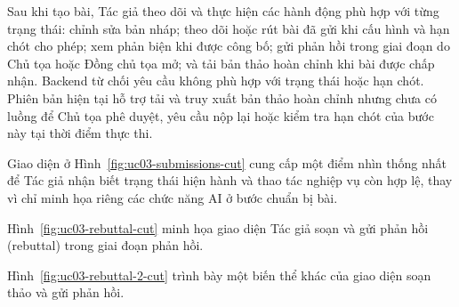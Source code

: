 Sau khi tạo bài, Tác giả theo dõi và thực hiện các hành động phù hợp với từng trạng thái: chỉnh sửa bản nháp; theo dõi hoặc rút bài đã gửi khi cấu hình và hạn chót cho phép; xem phản biện khi được công bố; gửi phản hồi trong giai đoạn do Chủ tọa hoặc Đồng chủ tọa mở; và tải bản thảo hoàn chỉnh khi bài được chấp nhận. Backend từ chối yêu cầu không phù hợp với trạng thái hoặc hạn chót. Phiên bản hiện tại hỗ trợ tải và truy xuất bản thảo hoàn chỉnh nhưng chưa có luồng để Chủ tọa phê duyệt, yêu cầu nộp lại hoặc kiểm tra hạn chót của bước này tại thời điểm thực thi.


Giao diện ở Hình~\ref{fig:uc03-submissions-cut} cung cấp một điểm nhìn thống nhất để Tác giả nhận biết trạng thái hiện hành và thao tác nghiệp vụ còn hợp lệ, thay vì chỉ minh họa riêng các chức năng AI ở bước chuẩn bị bài.


Hình~\ref{fig:uc03-rebuttal-cut} minh họa giao diện Tác giả soạn và gửi phản hồi (rebuttal) trong giai đoạn phản hồi.


Hình~\ref{fig:uc03-rebuttal-2-cut} trình bày một biến thể khác của giao diện soạn thảo và gửi phản hồi.


